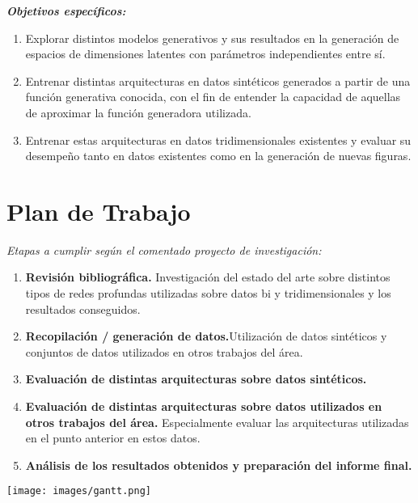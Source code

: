 \documentclass[spanish]{article}
\begin{document}
\textbf{\textit{Objetivos específicos:}}
\begin{enumerate}
    \item Explorar distintos modelos generativos y sus resultados en la generación de espacios de dimensiones latentes con parámetros independientes entre sí.
    \item Entrenar distintas arquitecturas en datos sintéticos generados a partir de una función generativa conocida, con el fin de entender la capacidad de aquellas de aproximar la función generadora utilizada.
    \item Entrenar estas arquitecturas en datos tridimensionales existentes y evaluar su desempeño tanto en datos existentes como en la generación de nuevas figuras.
\end{enumerate}


\section{Plan de Trabajo}
\textit{Etapas a cumplir según el comentado proyecto de investigación:}
\begin{enumerate}
    \item \textbf{Revisión bibliográfica.} Investigación del estado del arte sobre distintos tipos de redes profundas utilizadas sobre datos bi y tridimensionales y los resultados conseguidos.
    \item \textbf{Recopilación / generación de datos.}Utilización de datos sintéticos y conjuntos de datos utilizados en otros trabajos del área.
    \item \textbf{Evaluación de distintas arquitecturas sobre datos sintéticos.}
    \item \textbf{Evaluación de distintas arquitecturas sobre datos utilizados en otros trabajos del área.} Especialmente evaluar las arquitecturas utilizadas en el punto anterior en estos datos.
    \item \textbf{Análisis de los resultados obtenidos y preparación del informe final.}
\end{enumerate}
\begin{center}
    \texttt{[image: images/gantt.png]}
\end{center}



\end{document}
